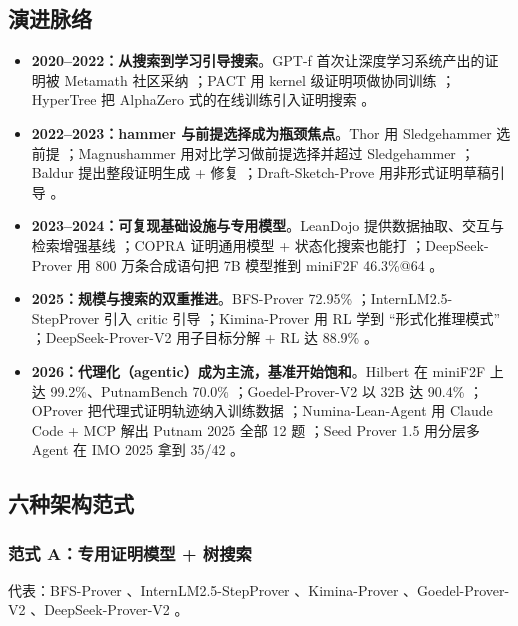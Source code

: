 \documentclass[UTF8,a4paper,11pt,fontset=windows]{ctexart}
\begin{document}
\subsection{演进脉络}

\begin{itemize}
  \item \textbf{2020--2022：从搜索到学习引导搜索}。GPT-f 首次让深度学习系统产出的证明被 Metamath 社区采纳 \cite{gptf}；PACT 用 kernel 级证明项做协同训练 \cite{pact}；HyperTree 把 AlphaZero 式的在线训练引入证明搜索 \cite{hypertree}。
  \item \textbf{2022--2023：hammer 与前提选择成为瓶颈焦点}。Thor 用 Sledgehammer 选前提 \cite{thor}；Magnushammer 用对比学习做前提选择并超过 Sledgehammer \cite{magnushammer}；Baldur 提出整段证明生成 + 修复 \cite{baldur}；Draft-Sketch-Prove 用非形式证明草稿引导 \cite{dsp}。
  \item \textbf{2023--2024：可复现基础设施与专用模型}。LeanDojo 提供数据抽取、交互与检索增强基线 \cite{leandojo}；COPRA 证明通用模型 + 状态化搜索也能打 \cite{copra}；DeepSeek-Prover 用 800 万条合成语句把 7B 模型推到 miniF2F 46.3\%@64 \cite{dsprover}。
  \item \textbf{2025：规模与搜索的双重推进}。BFS-Prover 72.95\% \cite{bfsprover}；InternLM2.5-StepProver 引入 critic 引导 \cite{internlm}；Kimina-Prover 用 RL 学到 ``形式化推理模式'' \cite{kimina}；DeepSeek-Prover-V2 用子目标分解 + RL 达 88.9\% \cite{dsprov2}。
  \item \textbf{2026：代理化（agentic）成为主流，基准开始饱和}。Hilbert 在 miniF2F 上达 99.2\%、PutnamBench 70.0\% \cite{hilbert}；Goedel-Prover-V2 以 32B 达 90.4\% \cite{goedelv2}；OProver 把代理式证明轨迹纳入训练数据 \cite{oprover}；Numina-Lean-Agent 用 Claude Code + MCP 解出 Putnam 2025 全部 12 题 \cite{numina}；Seed Prover 1.5 用分层多 Agent 在 IMO 2025 拿到 35/42 \cite{seedprover}。
\end{itemize}

\subsection{六种架构范式}

\subsubsection{范式 A：专用证明模型 + 树搜索}

代表：BFS-Prover \cite{bfsprover}、InternLM2.5-StepProver \cite{internlm}、Kimina-Prover \cite{kimina}、Goedel-Prover-V2 \cite{goedelv2}、DeepSeek-Prover-V2 \cite{dsprov2}。
\end{document}
